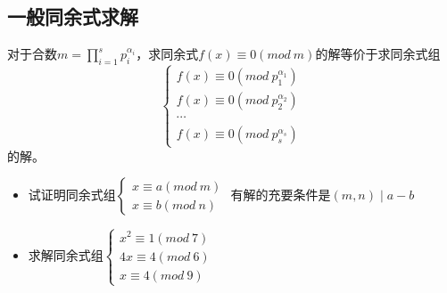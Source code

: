 \documentclass[cn,10pt]{elegantbook}
\begin{document}
\subsection{一般同余式求解}
对于合数$m = \prod_{i=1}^sp_i^{\alpha_i}$，求同余式$f(x) \equiv 0(mod\ m)$的解等价于求同余式组
\[\left\{
  \begin{matrix}
    f(x) \equiv 0(mod\ p_1^{\alpha_1})
    \\f(x) \equiv 0(mod\ p_2^{\alpha_2})
    \\ \cdots
    \\f(x) \equiv 0(mod\ p_s^{\alpha_s})
  \end{matrix}
\right.\]
的解。
\vskip 0.5cm
\begin{exercise}
  \begin{itemize}
    \item 试证明同余式组$\begin{cases}
    x \equiv a(mod\ m)
    \\x \equiv b(mod\ n)
    \end{cases}$
    有解的充要条件是$(m,n) \mid a-b$
    \item 求解同余式组$\begin{cases}
      x^2 \equiv 1(mod\ 7)
      \\4x \equiv 4(mod\ 6)
      \\x \equiv 4(mod\ 9)
    \end{cases}$
  \end{itemize}
\end{exercise}
\end{document}
